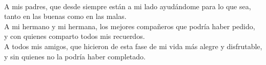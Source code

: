 \huge
\scshape\color{AzulFI_dark}
\\

\normalsize\normalfont\normalcolor

\itshape

A mis padres, que desde siempre están a mi lado ayudándome para lo que sea,\\
tanto en las buenas como en las malas.\\

A mi hermano y mi hermana, los mejores compañeros que podría haber pedido,\\
y con quienes comparto todos mis recuerdos.\\

A todos mis amigos, que hicieron de esta fase de mi vida más alegre y disfrutable,\\
y sin quienes no la podría haber completado.\\